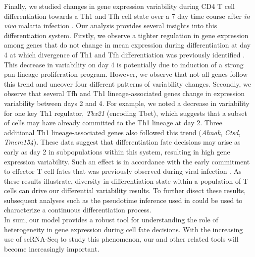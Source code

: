 Finally, we studied changes in gene expression variability during CD4\plus{} T cell differentiation towards a Th1 and Tfh cell state over a 7 day time course after \textit{in vivo} malaria infection \citep{Lonnberg2017}. Our analysis provides several insights into this differentiation system. Firstly, we observe a tighter regulation in gene expression among genes that do not change in mean expression during differentiation at day 4 at which divergence of Th1 and Tfh differentiation was previously identified \citep{Lonnberg2017}. This decrease in variability on day 4 is potentially due to induction of a strong pan-lineage proliferation program. However, we observe that not all genes follow this trend and uncover four different patterns of variability changes. Secondly, we observe that several Tfh and Th1 lineage-associated genes change in expression variability between days 2 and 4. For example, we noted a decrease in variability for one key Th1 regulator, \textit{Tbx21} (encoding Tbet), which suggests that a subset of cells may have already committed to the Th1 lineage at day 2. Three additional Th1 lineage-associated genes also followed this trend (\textit{Ahnak}, \textit{Ctsd}, \textit{Tmem154}). These data suggest that differentiation fate decisions may arise as early as day 2 in subpopulations within this system, resulting in high gene expression variability. Such an effect is in accordance with the early commitment to effector T cell fates that was previously observed during viral infection \citep{Choi2011}. As these results illustrate, diversity in differentiation state within a population of T cells can drive our differential variability results. To further disect these results, subsequent analyses such as the pseudotime inference used in \cite{Lonnberg2017} could be used to characterize a continuous differentiation process.\\

In sum, our model provides a robust tool for understanding the role of heterogeneity in gene expression during cell fate decisions. With the increasing use of scRNA-Seq to study this phenomenon, our and other related tools will become increasingly important.


